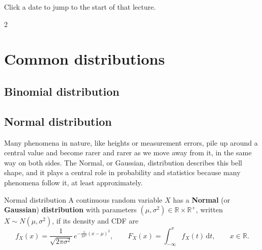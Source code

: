 \documentclass[a4paper,12pt,oneside]{report}
\makeatletter
\newcommand{\lecturelist}{\@starttoc{lec}}
\makeatother
\begin{document}
\makenotestitle

\thispagestyle{empty}
\begin{tcolorbox}[frontbox,title={Looking for a specific lecture?}]
Click a date to jump to the start of that lecture.
\begin{multicols}{2}
\lecturelist
\end{multicols}
\end{tcolorbox}
\clearpage

\notescontents

\setcounter{chapter}{-1}
\chapter{Common distributions}

\section{Binomial distribution}\label{sec:binomial}

\section{Normal distribution}\label{sec:normal}

Many phenomena in nature, like heights or measurement errors, pile up around
a central value and become rarer and rarer as we move away from it, in the
same way on both sides. The Normal, or Gaussian, distribution describes this
bell shape, and it plays a central role in probability and statistics because
many phenomena follow it, at least approximately.

\begin{frameddefn}{Normal distribution}\label{def:normal}
A continuous random variable $X$ has a \textbf{Normal} (or
\textbf{Gaussian}) \textbf{distribution} with parameters
$(\mu,\sigma^2)\in\mathbb{R}\times\mathbb{R}^+$, written
$X\sim N(\mu,\sigma^2)$, if its density and CDF are
\[
f_X(x)=\frac{1}{\sqrt{2\pi\sigma^2}}\,e^{-\frac{1}{2\sigma^2}(x-\mu)^2},
\qquad
F_X(x)=\int_{-\infty}^{x}f_X(t)\,\mathrm{d}t,
\qquad x\in\mathbb{R}.
\]
\end{frameddefn}
\end{document}

